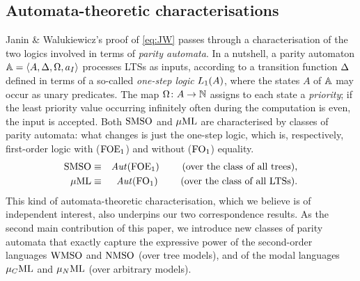 \subsection{Automata-theoretic characterisations}

Janin \& Walukiewicz's proof of \eqref{eq:JW} passes through a characterisation 
of the two logics involved in terms of \emph{parity automata}.
In a nutshell, a parity automaton $\mathbb{A} = \langle{A,\Delta,\Omega,a_I}\rangle$ processes
LTSs as inputs, according to a transition function $\Delta$ defined in terms of
a so-called \emph{one-step logic} $L_{1}(A)$, where the states $A$ of 
$\mathbb{A}$ may occur as unary predicates. 
The map $\Omega \colon A \to \mathbb{N}$ assigns to each state a \emph{priority};
if the least priority value occurring infinitely often during the computation is 
even, the input is accepted.
Both $\mathrm{SMSO}$ and $\mu\mathrm{ML}$ are characterised by classes of parity automata: what 
changes is just the one-step logic, which is, respectively, first-order logic 
with ($\mathrm{FOE}_1$) and without ($\mathrm{FO}_1$) equality. 
\begin{eqnarray}
\mathrm{SMSO} & \equiv & \mathit{Aut}(\mathrm{FOE}_1)
 \qquad \text{ (over the class of all trees)}, \label{eq:AutCharMSO}
\\ \mu\mathrm{ML} & \equiv & \mathit{Aut}(\mathrm{FO}_1)
  \qquad \text{ (over the class of all LTSs)}. \label{eq:AutCharMuML}
\end{eqnarray}
This kind of automata-theoretic characterisation, which we believe is of independent interest, also underpins our two correspondence results. As the second main contribution of this paper, we
introduce new classes of parity automata that exactly capture the expressive
power of the second-order languages $\mathrm{WMSO}$ and $\mathrm{NMSO}$ (over tree models), 
and of the modal languages $\mu_{C}\mathrm{ML}$ and $\mu_{N}\mathrm{ML}$ (over arbitrary models).

